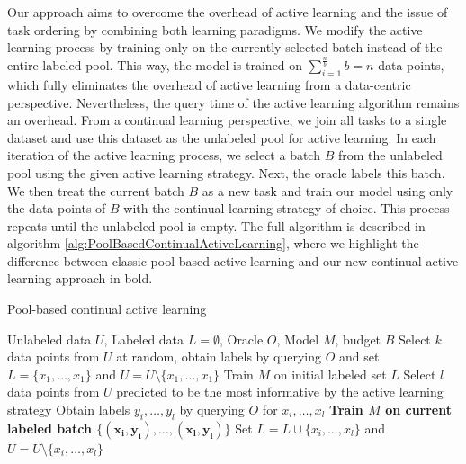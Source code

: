 Our approach aims to overcome the overhead of active learning and the issue of task ordering by combining both learning paradigms. We modify the active
learning process by training only on the currently selected batch instead of the entire labeled pool. This way, the model is trained on $\sum_{i=1}^{\frac{n}{b}} b = n$ 
data points, which fully eliminates the overhead of active learning from a data-centric perspective. Nevertheless, the query time of the active learning algorithm remains
an overhead. From a continual learning perspective, we join all tasks to a single dataset and use this dataset as the unlabeled pool for active learning. In each iteration
of the active learning process, we select a batch $B$ from the unlabeled pool using the given active learning strategy. Next, the oracle labels this batch.
We then treat the current batch $B$ as a new task and train our model using only the data points of $B$ with the continual learning strategy of
choice. This process repeats until the unlabeled pool is empty. The full algorithm is described in algorithm \ref{alg:PoolBasedContinualActiveLearning}, where we highlight
the difference between classic pool-based active learning and our new continual active learning approach in bold. \par

\begin{algorithm}
    \caption{Pool-based continual active learning} \label{alg:PoolBasedContinualActiveLearning}
    \begin{algorithmic}[1]
        \Require Unlabeled data $U$, Labeled data $L = \emptyset$, Oracle $O$, Model $M$, budget $B$
        \State Select $k$ data points from $U$ at random, obtain labels by querying $O$ and set $L=\{x_1,\ldots,x_1\}$
        and $U = U \setminus \{x_1,\ldots,x_1\}$ 
        \State Train $M$ on initial labeled set $L$
            \State Select $l$ data points from $U$ predicted to be the most informative by the active learning strategy
            \State Obtain labels $y_i,\ldots,y_l$ by querying $O$ for $x_i,\ldots,x_l$
            \State \textbf{Train $M$ on current labeled batch $\{\mathbf{(x_i,y_i),\ldots,(x_l,y_l)}\}$}
            \State Set $L= L \cup \{x_i,\ldots,x_l\}$ and $U = U \setminus \{x_i,\ldots,x_l\}$
        \EndWhile
    \end{algorithmic}
\end{algorithm}

